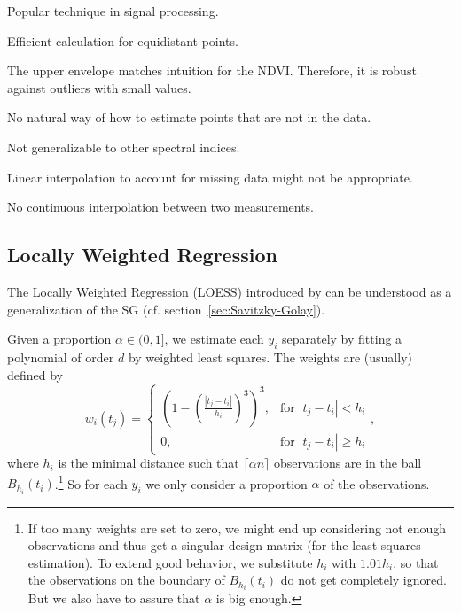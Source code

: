 		\begin{my_pros_cons_table}{
				\item Popular technique in signal processing.
				\item Efficient calculation for equidistant points.
				\item The upper envelope matches intuition for the NDVI. Therefore, it is robust against outliers with small values.
			}{
				\item No natural way of how to estimate points that are not in the data.
				\item Not generalizable to other spectral indices.
				\item Linear interpolation to account for missing data might not be appropriate.
				\item No continuous interpolation between two measurements.
			}
		\end{my_pros_cons_table}


	\subsection{Locally Weighted Regression}
		\label{sec:loess}

		The Locally Weighted Regression (LOESS) introduced by \cite{clevelandRobustLocallyWeighted1979} can be understood as a generalization of the SG (cf. section~\ref{sec:Savitzky-Golay}).

		Given a proportion $\alpha \in (0,1]$, we estimate each $y_i$ separately by fitting a polynomial of order $d$ by weighted least squares. The weights are (usually) defined by
		$$w_i(t_j)=\begin{cases}
				\left(1-\left(\frac{|t_j-t_i|}{h_i}\right)^{3}\right)^{3}, & \text{for } |t_j-t_i|<h_i           \\
				0,                                                   & \text{for } |t_j-t_i| \geqslant h_i
			\end{cases} ,$$
		where $h_i$ is the minimal distance such that $\lceil \alpha n\rceil$ observations are in the ball $B_{h_i}(t_i)$.\footnote{\label{footnote:LOESS}If too many weights are set to zero, we might end up considering not enough observations and thus get a singular design-matrix (for the least squares estimation). To extend good behavior, we substitute $h_i$ with $1.01 h_i$, so that the observations on the boundary of $B_{h_i}(t_i)$ do not get completely ignored. But we also have to assure that $\alpha$ is big enough.} So for each $y_i$ we only consider a proportion $\alpha$ of the observations.

